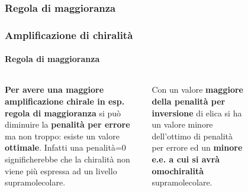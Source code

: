 \subsubsection{Regola di maggioranza}\begin{frame}\frametitle{Amplificazione di chiralità}\framesubtitle{Regola di maggioranza}
\begin{columns}
\textbf{Per avere una maggiore amplificazione chirale in esp. regola di maggioranza} si può diminuire la \textbf{penalità per errore} ma non troppo: esiste un valore \textbf{ottimale}. Infatti una penalità=0 significherebbe che la chiralità non viene più espressa ad un livello supramolecolare.

Con un valore \textbf{maggiore della penalità per inversione} di elica si ha un valore minore dell'ottimo di penalità per errore ed un \textbf{minore e.e. a cui si avrà omochiralità} supramolecolare. \cite{tesi}
\vspace{-13pt}
\begin{figure}{}\end{figure}
\end{columns}
\end{frame}
